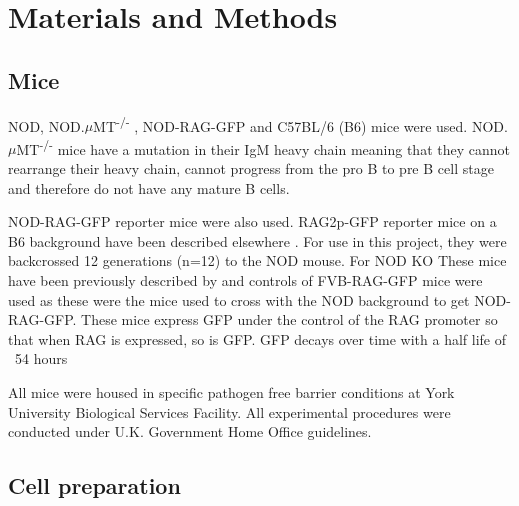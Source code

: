
\chapter{Materials and Methods}



\section{Mice}
\label{methods:mice}

NOD, NOD.$\mu$MT\textsuperscript{-/-} \citep{Serreze1996}, NOD-RAG-GFP and C57BL/6 (B6) mice were used.
NOD.$\mu$MT\textsuperscript{-/-} mice have a mutation in their IgM heavy chain meaning that they cannot rearrange their heavy chain, cannot progress from the pro B to pre B cell stage and therefore do not have any mature B cells.

NOD-RAG-GFP reporter mice were also used.
RAG2p-GFP reporter mice on a B6 background have been described elsewhere \citep{Yu1999}.
For use in this project, they were backcrossed 12 generations (n=12) to the NOD mouse.
For NOD KO
These mice have been previously described by  and controls of FVB-RAG-GFP mice were used as these were the mice used to cross with the NOD background to get NOD-RAG-GFP.
These mice express GFP under the control of the RAG promoter so that when RAG is expressed, so is GFP.
GFP decays over time with a half life of ~54 hours 

All mice were housed in specific pathogen free barrier conditions at York University Biological Services Facility. 
All experimental procedures were conducted under U.K. Government Home Office guidelines.






\section{Cell preparation}

